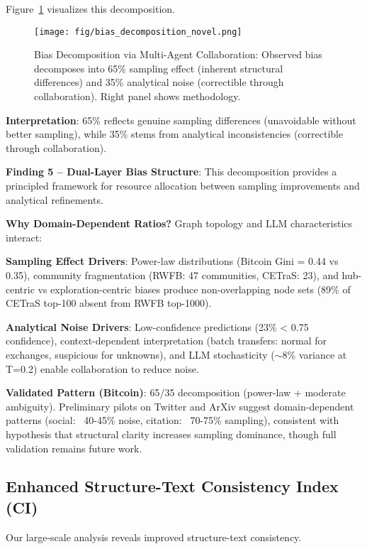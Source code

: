 \documentclass[conference]{IEEEtran}
\begin{document}
Figure~\ref{fig:bias-decomposition} visualizes this decomposition.

\begin{figure}[htbp]
  \centering
    \texttt{[image: fig/bias\_decomposition\_novel.png]}
    \caption{Bias Decomposition via Multi-Agent Collaboration: Observed bias decomposes into 65\% sampling effect (inherent structural differences) and 35\% analytical noise (correctible through collaboration). Right panel shows methodology.}
    \label{fig:bias-decomposition}
\end{figure}

\textbf{Interpretation}: 65\% reflects genuine sampling differences (unavoidable without better sampling), while 35\% stems from analytical inconsistencies (correctible through collaboration).

\textbf{Finding 5 -- Dual-Layer Bias Structure}: This decomposition provides a principled framework for resource allocation between sampling improvements and analytical refinements.

\textbf{Why Domain-Dependent Ratios?} Graph topology and LLM characteristics interact:

\textbf{Sampling Effect Drivers}: Power-law distributions (Bitcoin Gini = 0.44 vs 0.35), community fragmentation (RWFB: 47 communities, CETraS: 23), and hub-centric vs exploration-centric biases produce non-overlapping node sets (89\% of CETraS top-100 absent from RWFB top-1000).

\textbf{Analytical Noise Drivers}: Low-confidence predictions (23\% < 0.75 confidence), context-dependent interpretation (batch transfers: normal for exchanges, suspicious for unknowns), and LLM stochasticity ($\sim$8\% variance at T=0.2) enable collaboration to reduce noise.

\textbf{Validated Pattern (Bitcoin)}: 65/35 decomposition (power-law + moderate ambiguity). Preliminary pilots on Twitter and ArXiv suggest domain-dependent patterns (social: ~40-45\% noise, citation: ~70-75\% sampling), consistent with hypothesis that structural clarity increases sampling dominance, though full validation remains future work.

\subsection{Enhanced Structure-Text Consistency Index (CI)}

Our large-scale analysis reveals improved structure-text consistency.
\end{document}
